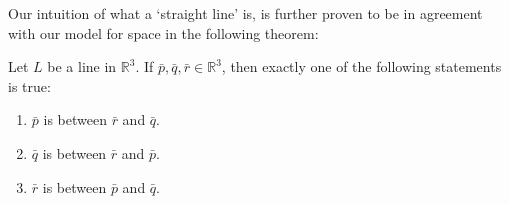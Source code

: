 Our intuition of what a `straight line' is, is further proven to be in agreement with our model for space in the following theorem:

\begin{theorembox}

  Let $L$ be a line in $\mathbb{R}^3$. If $\bar{p}, \bar{q}, \bar{r} \in \mathbb{R}^3$, then exactly one of the following statements is true:

  \begin{enumerate}[label=(\arabic*)]

    \item $\bar{p}$ is between $\bar{r}$ and $\bar{q}$.

    \item $\bar{q}$ is between $\bar{r}$ and $\bar{p}$.

    \item $\bar{r}$ is between $\bar{p}$ and $\bar{q}$.

  \end{enumerate}

\end{theorembox}
  
